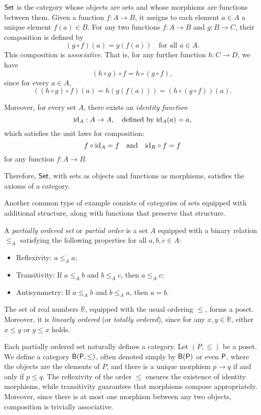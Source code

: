 \begin{example}
 $\mathsf{Set}$ is the category whose objects are sets and whose  morphisms are functions between them. Given a function \(f: A \to B\), it assigns to each element \(a \in A\) a unique element \(f(a) \in B\). 
 For any two functions \(f: A \to B\) and \(g: B \to C\), their composition is defined by
$$
(g \circ f)(a) = g(f(a)) \quad \text{for all } a \in A.
$$
This composition is \emph{associative}. That is, for any further function \(h: C \to D\), we have
\[
(h \circ g) \circ f = h \circ (g \circ f),
\]
since for every \(a \in A\),
\[
((h \circ g) \circ f)(a) = h(g(f(a))) = (h \circ (g \circ f))(a).
\]

Moreover, for every set \(A\), there exists an \emph{identity function}
\[
\mathrm{id}_A : A \to A, \quad \text{defined by } \mathrm{id}_A(a) = a,
\]
which satisfies the unit laws for composition:
\[
f \circ \mathrm{id}_A = f \quad \text{and} \quad \mathrm{id}_B \circ f = f
\]
for any function \(f: A \to B\).

Therefore, \(\mathsf{Set}\), with sets as objects and functions as morphisms, satisfies the axioms of a category.
\end{example}

Another common type of example consists of categories of sets equipped with additional structure, along with functions that preserve that structure.


\begin{definition}
A \emph{partially ordered set} or \emph{partial order} is a set $A$ equipped with a binary relation $\leq_A$ satisfying the following properties for all $a, b, c \in A$:
\begin{itemize}
    \item Reflexivity: $a \leq_A a$;
    \item Transitivity: If $a \leq_A b$ and $b \leq_A c$, then $a \leq_A c$;
    \item Antisymmetry: If $a \leq_A b$ and $b \leq_A a$, then $a = b$.
\end{itemize}
\end{definition}

\begin{example}
The set of real numbers \(\mathbb{R}\), equipped with the usual ordering \(\leq\), forms a poset. Moreover, it is \emph{linearly ordered} (or \emph{totally ordered}), since for any \(x, y \in \mathbb{R}\), either \(x \leq y\) or \(y \leq x\) holds.
\end{example}

\begin{example}
  Each partially ordered set naturally defines a category. Let \( (P, \leq) \) be a poset. We define a category \( \mathsf{B(P, \leq)} \), often denoted simply by \( \mathsf{B(P)} \) or even \( \mathsf{P} \), where the objects are the elements of \( P \), and there is a unique morphism \( p \to q \) if and only if \( p \leq q \). The reflexivity of the order \( \leq \) ensures the existence of identity morphisms, while transitivity guarantees that morphisms compose appropriately. Moreover, since there is at most one morphism between any two objects, composition is trivially associative. 
\end{example}

